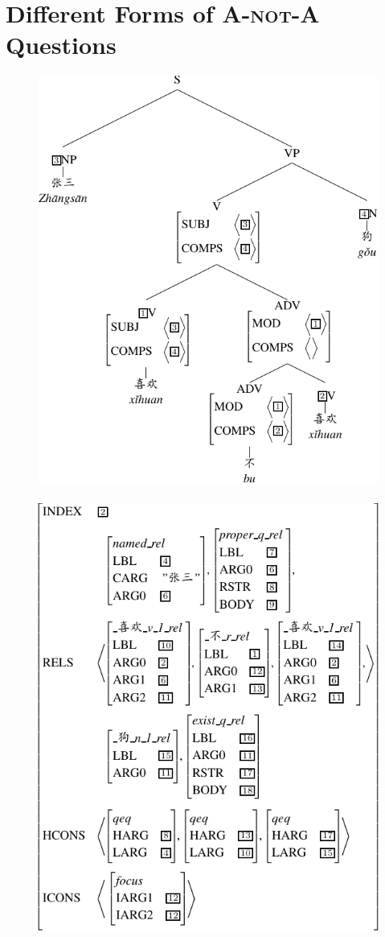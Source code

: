 \documentclass[11pt]{article}
\def\anota{\textsc{A-not-A}}
\begin{document}
\section{Different Forms of {\anota} Questions}
\label{sec:forms}


\begin{figure}[!t]
\centering
\includegraphics[scale=.8]{pdf/tree1.pdf}
\mbox{ }~\mbox{ }~\mbox{ } 
\includegraphics[scale=.8]{pdf/mrs.pdf}

\end{figure}
\end{document}
